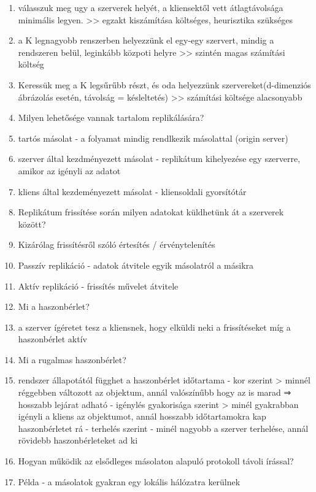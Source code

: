\documentclass[twoside, a4paper, 12pt]{article}
\begin{document}
\begin{enumerate}
    \item válasszuk meg ugy a szerverek helyét, a kliensektől vett átlagtávolsága minimális legyen.
        >> egzakt kiszámítása költséges, heurisztika szükséges
    \item a K legnagyobb renszerben helyezzünk el egy-egy szervert, mindig a rendszeren belül, leginkább közpoti helyre
        >>  szintén magas számítási költség
    \item Keressük meg a K legsűrűbb részt, és oda helyezzünk szervereket(d-dimenziós ábrázolás esetén, távolság = késleltetés)
        >> számítási költsége alacsonyabb	
    \item  Milyen lehetősége vannak tartalom replikálására?
    \item tartós másolat
        - a folyamat mindig rendlkezik másolattal (origin server)
    \item szerver által kezdményezett másolat
        - replikátum kihelyezése egy szerverre, amikor az igényli az adatot
    \item kliens által kezdeményezett másolat
        - kliensoldali gyorsítótár
    \item  Replikátum frissítése során milyen adatokat küldhetünk át a szerverek között?
    \item Kizárólag frissítésről szóló értesítés / érvénytelenítés
    \item Passzív replikáció
        - adatok átvitele egyik másolatról a másikra
    \item Aktív replikáció
        - frissítés művelet átvitele
    \item  Mi a haszonbérlet?	
    \item a szerver ígéretet tesz a kliensnek, hogy elküldi neki a frissítéseket míg a haszonbérlet aktív
    \item  Mi a rugalmas haszonbérlet?
    \item rendszer állapotától függhet a haszonbérlet időtartama
        - kor szerint 
        > minnél réggebben változott az objektum, annál valószínűbb hogy az is marad 
        ⇒ hosszabb lejárat adható
        - igénylés gyakorisága szerint
        > minél gyakrabban igényli a kliens az objektumot, annál hosszabb időtartamokra kap haszonbérletet rá
        - terhelés szerint
        - minél nagyobb a szerver terhelése, annál rövidebb haszonbérleteket ad ki 
    \item  Hogyan működik az elsődleges másolaton alapuló protokoll távoli írással?	
    \item Példa
        - a másolatok gyakran egy lokális hálózatra kerülnek

\end{enumerate}
\end{document}
